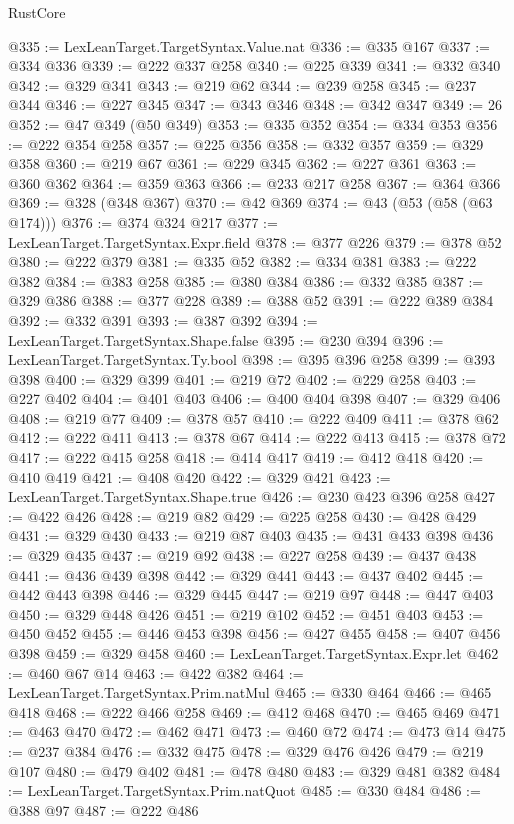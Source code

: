 \begin{lexlean}{RustCore}
\begin{coremodule}
@335 := LexLeanTarget.TargetSyntax.Value.nat
@336 := @335 @167
@337 := @334 @336
@339 := @222 @337 @258
@340 := @225 @339
@341 := @332 @340
@342 := @329 @341
@343 := @219 @62
@344 := @239 @258
@345 := @237 @344
@346 := @227 @345
@347 := @343 @346
@348 := @342 @347
@349 := 26
@352 := @47 @349 (@50 @349)
@353 := @335 @352
@354 := @334 @353
@356 := @222 @354 @258
@357 := @225 @356
@358 := @332 @357
@359 := @329 @358
@360 := @219 @67
@361 := @229 @345
@362 := @227 @361
@363 := @360 @362
@364 := @359 @363
@366 := @233 @217 @258
@367 := @364 @366
@369 := @328 (@348 @367)
@370 := @42 @369
@374 := @43 (@53 (@58 (@63 @174)))
@376 := @374 @324 @217
@377 := LexLeanTarget.TargetSyntax.Expr.field
@378 := @377 @226
@379 := @378 @52
@380 := @222 @379
@381 := @335 @52
@382 := @334 @381
@383 := @222 @382
@384 := @383 @258
@385 := @380 @384
@386 := @332 @385
@387 := @329 @386
@388 := @377 @228
@389 := @388 @52
@391 := @222 @389 @384
@392 := @332 @391
@393 := @387 @392
@394 := LexLeanTarget.TargetSyntax.Shape.false
@395 := @230 @394
@396 := LexLeanTarget.TargetSyntax.Ty.bool
@398 := @395 @396 @258
@399 := @393 @398
@400 := @329 @399
@401 := @219 @72
@402 := @229 @258
@403 := @227 @402
@404 := @401 @403
@406 := @400 @404 @398
@407 := @329 @406
@408 := @219 @77
@409 := @378 @57
@410 := @222 @409
@411 := @378 @62
@412 := @222 @411
@413 := @378 @67
@414 := @222 @413
@415 := @378 @72
@417 := @222 @415 @258
@418 := @414 @417
@419 := @412 @418
@420 := @410 @419
@421 := @408 @420
@422 := @329 @421
@423 := LexLeanTarget.TargetSyntax.Shape.true
@426 := @230 @423 @396 @258
@427 := @422 @426
@428 := @219 @82
@429 := @225 @258
@430 := @428 @429
@431 := @329 @430
@433 := @219 @87 @403
@435 := @431 @433 @398
@436 := @329 @435
@437 := @219 @92
@438 := @227 @258
@439 := @437 @438
@441 := @436 @439 @398
@442 := @329 @441
@443 := @437 @402
@445 := @442 @443 @398
@446 := @329 @445
@447 := @219 @97
@448 := @447 @403
@450 := @329 @448 @426
@451 := @219 @102
@452 := @451 @403
@453 := @450 @452
@455 := @446 @453 @398
@456 := @427 @455
@458 := @407 @456 @398
@459 := @329 @458
@460 := LexLeanTarget.TargetSyntax.Expr.let
@462 := @460 @67 @14
@463 := @422 @382
@464 := LexLeanTarget.TargetSyntax.Prim.natMul
@465 := @330 @464
@466 := @465 @418
@468 := @222 @466 @258
@469 := @412 @468
@470 := @465 @469
@471 := @463 @470
@472 := @462 @471
@473 := @460 @72
@474 := @473 @14
@475 := @237 @384
@476 := @332 @475
@478 := @329 @476 @426
@479 := @219 @107
@480 := @479 @402
@481 := @478 @480
@483 := @329 @481 @382
@484 := LexLeanTarget.TargetSyntax.Prim.natQuot
@485 := @330 @484
@486 := @388 @97
@487 := @222 @486

\end{coremodule}
\end{lexlean}
